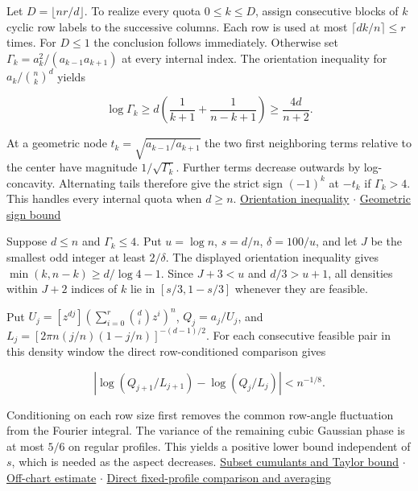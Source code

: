 \documentclass[11pt]{article}
\begin{document}
Let $D=\lfloor nr/d\rfloor$. To realize every quota $0\le k\le D$, assign consecutive blocks of $k$ cyclic row labels to the successive columns. Each row is used at most $\lceil dk/n\rceil\le r$ times. For $D\le1$ the conclusion follows immediately. Otherwise set $\Gamma_k=a_k^2/(a_{k-1}a_{k+1})$ at every internal index. The orientation inequality for $a_k/\binom nk^d$ yields

\[
\log\Gamma_k\ge d\left(\frac1{k+1}+\frac1{n-k+1}\right)\ge\frac{4d}{n+2}.
\]

At a geometric node $t_k=\sqrt{a_{k-1}/a_{k+1}}$ the two first neighboring terms relative to the center have magnitude $1/\sqrt{\Gamma_k}$. Further terms decrease outwards by log-concavity. Alternating tails therefore give the strict sign $(-1)^k$ at $-t_k$ if $\Gamma_k>4$. This handles every internal quota when $d\ge n$. \href{https://github.com/ProgramComputer/open-math-research/blob/main/topics/balanced-arrays/orientation-normalization.md}{Orientation inequality}  $\cdot$  \href{https://github.com/ProgramComputer/open-math-research/blob/main/topics/balanced-arrays/adjacent-quotas/README.md}{Geometric sign bound}

Suppose $d\le n$ and $\Gamma_k\le4$. Put $u=\log n$, $s=d/n$, $\delta=100/u$, and let $J$ be the smallest odd integer at least $2/\delta$. The displayed orientation inequality gives $\min(k,n-k)\ge d/\log4-1$. Since $J+3<u$ and $d/3>u+1$, all densities within $J+2$ indices of $k$ lie in $[s/3,1-s/3]$ whenever they are feasible.

Put $U_j=[z^{dj}](\sum_{i=0}^r\binom di z^i)^n$, $Q_j=a_j/U_j$, and $L_j=[2\pi n (j/n)(1-j/n)]^{-(d-1)/2}$. For each consecutive feasible pair in this density window the direct row-conditioned comparison gives

\[
\left|\log(Q_{j+1}/L_{j+1})-\log(Q_j/L_j)\right|< n^{-1/8}.
\]

Conditioning on each row size first removes the common row-angle fluctuation from the Fourier integral. The variance of the remaining cubic Gaussian phase is at most $5/6$ on regular profiles. This yields a positive lower bound independent of $s$, which is needed as the aspect decreases. \href{https://github.com/ProgramComputer/open-math-research/blob/main/topics/balanced-arrays/effective-sublinear/direct-row-expansion.md}{Subset cumulants and Taylor bound}  $\cdot$  \href{https://github.com/ProgramComputer/open-math-research/blob/main/topics/balanced-arrays/effective-sublinear/direct-row-tail.md}{Off-chart estimate}  $\cdot$  \href{https://github.com/ProgramComputer/open-math-research/blob/main/topics/balanced-arrays/effective-sublinear/direct-comparison.md}{Direct fixed-profile comparison and averaging}
\end{document}
